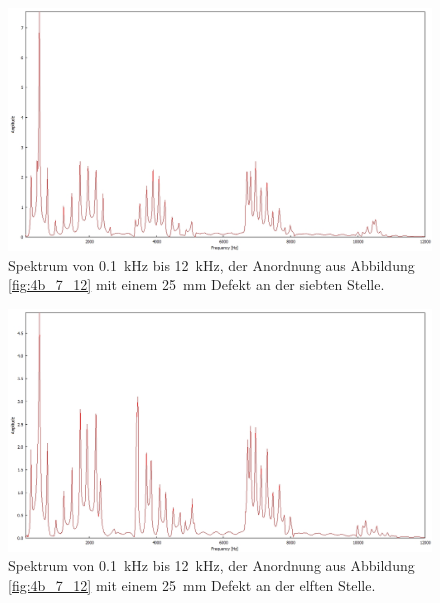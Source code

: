 \begin{figure}
\centering
\includegraphics[width=\textwidth]{content/messungen/Chapter4b/4b_7_2b.jpg}
\caption{Spektrum von 0.1~kHz bis 12~kHz, der Anordnung aus Abbildung \ref{fig:4b_7_12} mit einem 25~mm Defekt an der siebten Stelle.}
\label{fig:4b_7_2b}
\end{figure}
\begin{figure}
\centering
\includegraphics[width=\textwidth]{content/messungen/Chapter4b/4b_7_2c.jpg}
\caption{Spektrum von 0.1~kHz bis 12~kHz, der Anordnung aus Abbildung \ref{fig:4b_7_12} mit einem 25~mm Defekt an der elften Stelle.}
\label{fig:4b_7_2c}
\end{figure}